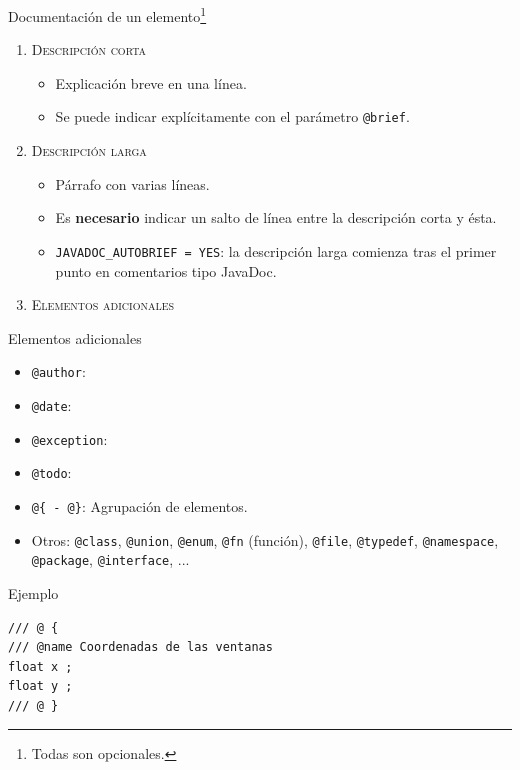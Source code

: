 \documentclass[12pt,xcolor=svgnames]{beamer}
\begin{document}
\begin{frame}{Documentación de un elemento\footnote{Todas son opcionales.}}
  \begin{enumerate}
  \item \textsc{Descripción corta}
    \begin{itemize}
    \item Explicación breve en una línea.
    \item Se puede indicar explícitamente con el parámetro \texttt{@brief}.
    \end{itemize}
  \item \textsc{Descripción larga}
    \begin{itemize}
    \item Párrafo con varias líneas.
    \item Es \textbf{necesario} indicar un salto de línea entre la descripción
      corta y ésta.
    \item \texttt{JAVADOC\_AUTOBRIEF = YES}: la descripción larga comienza tras
      el primer punto en comentarios tipo JavaDoc.
    \end{itemize}
  \item \textsc{Elementos adicionales}
  \end{enumerate}
\end{frame}

\begin{frame}{Elementos adicionales}
  \begin{itemize}
  \item \texttt{@author}:
  \item \texttt{@date}:
  \item \texttt{@exception}:
  \item \texttt{@todo}:
  \item \texttt{@\{ - @\}}: Agrupación de elementos.
  \item Otros: \texttt{@class}, \texttt{@union}, \texttt{@enum}, \texttt{@fn}
    (función), \texttt{@file}, \texttt{@typedef}, \texttt{@namespace},
    \texttt{@package}, \texttt{@interface}, ...
  \end{itemize}
\end{frame}

\begin{frame}[fragile]{Ejemplo}
  \begin{verbatim}
/// @ {
/// @name Coordenadas de las ventanas
float x ;
float y ;
/// @ }
\end{verbatim}
\end{frame}
\end{document}
